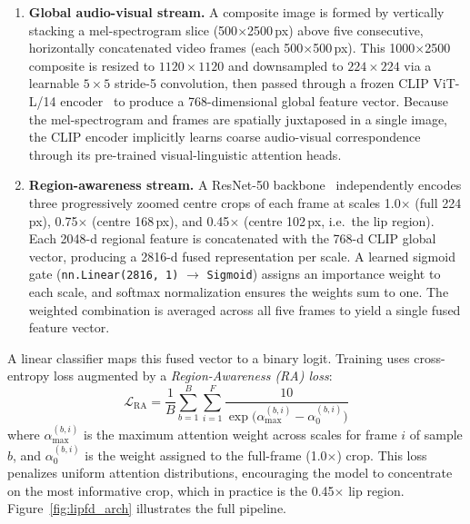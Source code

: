 \documentclass[conference]{IEEEtran}
\begin{document}
\begin{enumerate}[leftmargin=*]
    \item \textbf{Global audio-visual stream.}  A composite image is formed by vertically stacking a mel-spectrogram slice (500${\times}$2500\,px) above five consecutive, horizontally concatenated video frames (each 500${\times}$500\,px).  This 1000${\times}$2500 composite is resized to $1120{\times}1120$ and downsampled to $224{\times}224$ via a learnable $5{\times}5$ stride-5 convolution, then passed through a frozen CLIP ViT-L/14 encoder~\cite{radford2021clip} to produce a 768-dimensional global feature vector.  Because the mel-spectrogram and frames are spatially juxtaposed in a single image, the CLIP encoder implicitly learns coarse audio-visual correspondence through its pre-trained visual-linguistic attention heads.

    \item \textbf{Region-awareness stream.}  A ResNet-50 backbone~\cite{he2016resnet} independently encodes three progressively zoomed centre crops of each frame at scales 1.0${\times}$ (full 224\,px), 0.75${\times}$ (centre 168\,px), and 0.45${\times}$ (centre 102\,px, i.e.\ the lip region).  Each 2048-d regional feature is concatenated with the 768-d CLIP global vector, producing a 2816-d fused representation per scale.  A learned sigmoid gate (\texttt{nn.Linear(2816, 1)} $\to$ \texttt{Sigmoid}) assigns an importance weight to each scale, and softmax normalization ensures the weights sum to one.  The weighted combination is averaged across all five frames to yield a single fused feature vector.
\end{enumerate}

\noindent A linear classifier maps this fused vector to a binary logit.  Training uses cross-entropy loss augmented by a \emph{Region-Awareness (RA) loss}:
\begin{equation}
    \mathcal{L}_{\text{RA}} = \frac{1}{B}\sum_{b=1}^{B}\sum_{i=1}^{F} \frac{10}{\exp\bigl(\alpha_{\max}^{(b,i)} - \alpha_{0}^{(b,i)}\bigr)}
\end{equation}
where $\alpha_{\max}^{(b,i)}$ is the maximum attention weight across scales for frame $i$ of sample $b$, and $\alpha_{0}^{(b,i)}$ is the weight assigned to the full-frame (1.0${\times}$) crop.  This loss penalizes uniform attention distributions, encouraging the model to concentrate on the most informative crop, which in practice is the 0.45${\times}$ lip region.  Figure~\ref{fig:lipfd_arch} illustrates the full pipeline.
\end{document}
